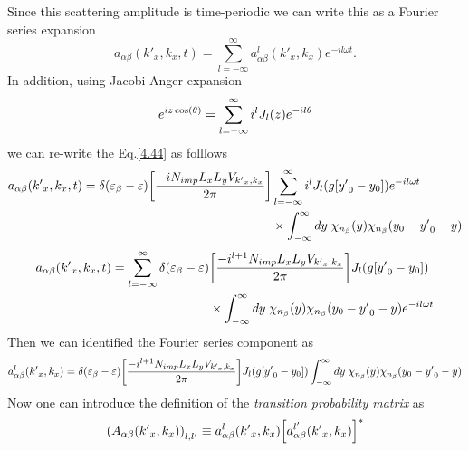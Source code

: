 Since this scattering amplitude is time-periodic we can write this as a Fourier series expansion
\begin{equation} \label{4.45}
    a_{\alpha\beta}({k'}_x,k_x,t) =
    \sum_{l=-\infty}^{\infty} a^l_{\alpha\beta}({k'}_x,k_x) e^{-il\omega t}.
\end{equation}
In addition, using Jacobi-Anger expansion
\begin{equation} \label{4.46}
    e^{iz\cos(\theta)} = \sum_{l=-\infty}^{\infty} i^l J_l\qty(z) e^{-il\theta}
\end{equation}
we can re-write the Eq.\eqref{4.44} as folllows
\begin{equation} \label{4.47}
  \begin{aligned}
    a_{\alpha\beta}({k'}_x,k_x,t)  =
    \delta(\varepsilon_{\beta} - \varepsilon)
    \qty[\frac{-i N_{imp} L_xL_y V_{{k'}_x,k_x}}{2\pi}]&
    \sum_{l=-\infty}^{\infty} i^l J_l\qty(g[{y'}_0 - y_0]) e^{-il\omega t}\\
    & \times
    \int_{-\infty}^{\infty} dy \;
    {\chi}_{n_{\beta}}\qty(y)
    {\chi}_{n_{\beta}}\qty(y_0 - {y'}_0 - y)
  \end{aligned}
\end{equation}
\begin{equation} \label{4.48}
  \begin{aligned}
    a_{\alpha\beta}({k'}_x,k_x,t)  =
    \sum_{l=-\infty}^{\infty}
    \delta(\varepsilon_{\beta} - \varepsilon) &
    \qty[\frac{-i^{l+1} N_{imp} L_xL_y V_{{k'}_x,k_x}}{2\pi}]
    J_l\qty(g[{y'}_0 - y_0]) \\
    & \times
    \int_{-\infty}^{\infty} dy \;
    {\chi}_{n_{\beta}}\qty(y)
    {\chi}_{n_{\beta}}\qty(y_0 - {y'}_0 - y) e^{-il\omega t}
  \end{aligned}
\end{equation}
Then we can identified the Fourier series component as
\begin{equation} \label{4.49}
    a^l_{\alpha\beta}({k'}_x,k_x) =
    \delta(\varepsilon_{\beta} - \varepsilon)
    \qty[\frac{-i^{l+1} N_{imp} L_xL_y V_{{k'}_x,k_x}}{2\pi}]
    J_l\qty(g[{y'}_0 - y_0])
    \int_{-\infty}^{\infty} dy \;
    {\chi}_{n_{\beta}}\qty(y)
    {\chi}_{n_{\beta}}\qty(y_0 - {y'}_0 - y)
\end{equation}
Now one can introduce the definition of the \textit{transition probability matrix} as
\begin{equation} \label{4.50}
    \qty(A_{\alpha\beta}({k'}_x,k_x))_{l,l'} \equiv
    a^l_{\alpha\beta}({k'}_x,k_x)\qty[a^{l'}_{\alpha\beta}({k'}_x,k_x)]^{*}
\end{equation}
